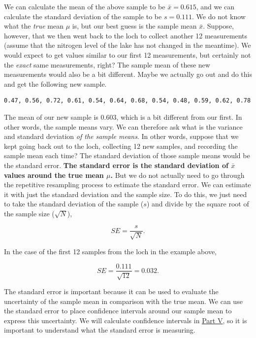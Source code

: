 \documentclass[
]{scrbook}
\begin{document}
We can calculate the mean of the above sample to be \(\bar{x} = 0.615\), and we can calculate the standard deviation of the sample to be \(s = 0.111\).
We do not know what the \emph{true} mean \(\mu\) is, but our best guess is the sample mean \(\bar{x}\).
Suppose, however, that we then went back to the loch to collect another 12 measurements (assume that the nitrogen level of the lake has not changed in the meantime).
We would expect to get values similar to our first 12 measurements, but certainly not the \emph{exact} same measurements, right?
The sample mean of these new measurements would also be a bit different.
Maybe we actually go out and do this and get the following new sample.

\begin{verbatim}
0.47, 0.56, 0.72, 0.61, 0.54, 0.64, 0.68, 0.54, 0.48, 0.59, 0.62, 0.78
\end{verbatim}

The mean of our new sample is 0.603, which is a bit different from our first.
In other words, the sample means vary.
We can therefore ask what is the variance and standard deviation \emph{of the sample means}.
In other words, suppose that we kept going back out to the loch, collecting 12 new samples, and recording the sample mean each time?
The standard deviation of those sample means would be the standard error.
\textbf{The standard error is the standard deviation of \(\bar{x}\) values around the true mean \(\mu\).}
But we do not actually need to go through the repetitive resampling process to estimate the standard error.
We can estimate it with just the standard deviation and the sample size.
To do this, we just need to take the standard deviation of the sample (\(s\)) and divide by the square root of the sample size (\(\sqrt{N}\)),

\[SE = \frac{s}{\sqrt{N}}.\]

In the case of the first 12 samples from the loch in the example above,

\[SE = \frac{0.111}{\sqrt{12}} = 0.032.\]

The standard error is important because it can be used to evaluate the uncertainty of the sample mean in comparison with the true mean.
We can use the standard error to place confidence intervals around our sample mean to express this uncertainty.
We will calculate confidence intervals in \protect\hyperlink{Week5}{Part V}, so it is important to understand what the standard error is measuring.
\end{document}
